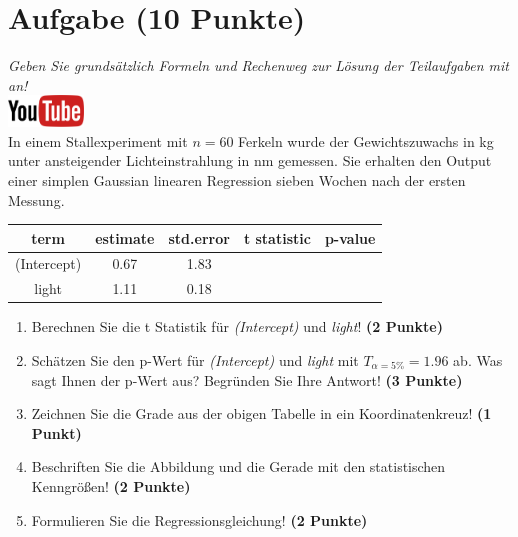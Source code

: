 \documentclass[a4paper, 9pt]{scrartcl}\usepackage[]{graphicx}\usepackage[]{xcolor}
\begin{document}
\section{Aufgabe \hfill (10 Punkte)}

\textit{Geben Sie grunds{\"a}tzlich Formeln und Rechenweg zur L{\"o}sung der
  Teilaufgaben mit an!} \\[1Ex]

\hfill\href{https://youtu.be/lJp8rFmMnrs}{\includegraphics[width =
  2cm]{img/youtube}}\\[1Ex]



In einem Stallexperiment mit $n = 60$ Ferkeln wurde der
Gewichtszuwachs in kg unter ansteigender Lichteinstrahlung in nm
gemessen. Sie erhalten den \Rlogo Output einer
simplen Gaussian linearen Regression sieben Wochen nach der ersten Messung.

\begin{table}[!h]
\centering\begingroup\fontsize{14}{16}\selectfont

\begin{tabular}{ccccc}
\toprule
term & estimate & std.error & t statistic & p-value\\
\midrule
(Intercept) & 0.67 & 1.83 &  & \\
light & 1.11 & 0.18 &  & \\
\bottomrule
\end{tabular}
\endgroup{}
\end{table}



\begin{enumerate}
\item Berechnen Sie die t Statistik f{\"u}r \textit{(Intercept)} und
  \textit{light}! \textbf{(2 Punkte)}
\item Sch{\"a}tzen Sie den p-Wert f{\"u}r \textit{(Intercept)} und
  \textit{light} mit $T_{\alpha = 5\%} = 1.96$ ab. Was sagt Ihnen der p-Wert aus?
  Begr{\"u}nden Sie Ihre Antwort! \textbf{(3 Punkte)}
\item Zeichnen Sie die Grade aus der obigen Tabelle in ein Koordinatenkreuz! \textbf{(1 Punkt)}
\item Beschriften Sie die Abbildung und die Gerade mit den statistischen
  Kenngr{\"o}{\ss}en! \textbf{(2 Punkte)}
\item Formulieren Sie die Regressionsgleichung! \textbf{(2 Punkte)}
\end{enumerate} 
\clearpage
\end{document}
